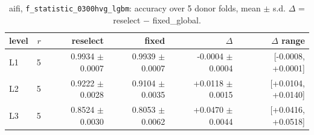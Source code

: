 \begin{table}[t]
\centering
\small
\begin{tabular}{lrrrrr}
\toprule
level & $r$ & reselect & fixed & $\Delta$ & $\Delta$ range \\
\midrule
L1 & 5 & 0.9934 $\pm$ 0.0007 & 0.9939 $\pm$ 0.0007 & -0.0004 $\pm$ 0.0004 & [-0.0008, +0.0001] \\
L2 & 5 & 0.9222 $\pm$ 0.0028 & 0.9104 $\pm$ 0.0035 & +0.0118 $\pm$ 0.0015 & [+0.0104, +0.0140] \\
L3 & 5 & 0.8524 $\pm$ 0.0030 & 0.8053 $\pm$ 0.0062 & +0.0470 $\pm$ 0.0044 & [+0.0416, +0.0518] \\
\bottomrule
\end{tabular}
\caption{aifi, \texttt{f\_statistic\_0300hvg\_lgbm}: accuracy over 5 donor folds, mean $\pm$ s.d. $\Delta$ = reselect $-$ fixed\_global.}
\label{tab:cv-aifi-f-statistic-0300hvg-lgbm-accuracy}
\end{table}
